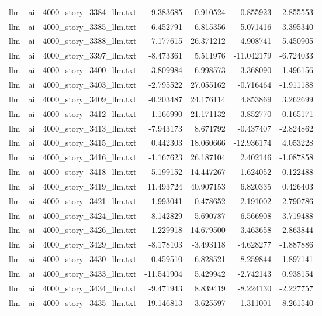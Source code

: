 \begin{longtable}{lllrrrr}
llm & ai & 4000\_story\_3384\_llm.txt & -9.383685 & -0.910524 & 0.855923 & -2.855553 \\
llm & ai & 4000\_story\_3385\_llm.txt & 6.452791 & 6.815356 & 5.071416 & 3.395340 \\
llm & ai & 4000\_story\_3388\_llm.txt & 7.177615 & 26.371212 & -4.908741 & -5.450905 \\
llm & ai & 4000\_story\_3397\_llm.txt & -8.473361 & 5.511976 & -11.042179 & -6.724033 \\
llm & ai & 4000\_story\_3400\_llm.txt & -3.809984 & -6.998573 & -3.368090 & 1.496156 \\
llm & ai & 4000\_story\_3403\_llm.txt & -2.795522 & 27.055162 & -0.716464 & -1.911188 \\
llm & ai & 4000\_story\_3409\_llm.txt & -0.203487 & 24.176114 & 4.853869 & 3.262699 \\
llm & ai & 4000\_story\_3412\_llm.txt & 1.166990 & 21.171132 & 3.852770 & 0.165171 \\
llm & ai & 4000\_story\_3413\_llm.txt & -7.943173 & 8.671792 & -0.437407 & -2.824862 \\
llm & ai & 4000\_story\_3415\_llm.txt & 0.442303 & 18.060666 & -12.936174 & 4.053228 \\
llm & ai & 4000\_story\_3416\_llm.txt & -1.167623 & 26.187104 & 2.402146 & -1.087858 \\
llm & ai & 4000\_story\_3418\_llm.txt & -5.199152 & 14.447267 & -1.624052 & -0.122488 \\
llm & ai & 4000\_story\_3419\_llm.txt & 11.493724 & 40.907153 & 6.820335 & 0.426403 \\
llm & ai & 4000\_story\_3421\_llm.txt & -1.993041 & 0.478652 & 2.191002 & 2.790786 \\
llm & ai & 4000\_story\_3424\_llm.txt & -8.142829 & 5.690787 & -6.566908 & -3.719488 \\
llm & ai & 4000\_story\_3426\_llm.txt & 1.229918 & 14.679500 & 3.463658 & 2.863844 \\
llm & ai & 4000\_story\_3429\_llm.txt & -8.178103 & -3.493118 & -4.628277 & -1.887886 \\
llm & ai & 4000\_story\_3430\_llm.txt & 0.459510 & 6.828521 & 8.259844 & 1.897141 \\
llm & ai & 4000\_story\_3433\_llm.txt & -11.541904 & 5.429942 & -2.742143 & 0.938154 \\
llm & ai & 4000\_story\_3434\_llm.txt & -9.471943 & 8.839419 & -8.224130 & -2.227757 \\
llm & ai & 4000\_story\_3435\_llm.txt & 19.146813 & -3.625597 & 1.311001 & 8.261540 \\

\end{longtable}
